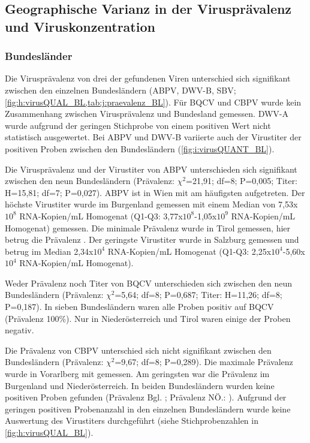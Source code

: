 \subsection{Geographische Varianz in der Virusprävalenz und Viruskonzentration}
\subsubsection{Bundesländer}

Die Virusprävalenz von drei der gefundenen Viren unterschied sich signifikant zwischen den einzelnen Bundesländern (ABPV, DWV-B, SBV; \cref{fig:h:virusQUAL_BL,tab:j:praevalenz_BL}). Für BQCV und CBPV wurde kein Zusammenhang zwischen Virusprävalenz und Bundesland gemessen. DWV-A wurde aufgrund der geringen Stichprobe von einem positiven Wert nicht statistisch ausgewertet. Bei ABPV und DWV-B variierte auch der Virustiter der positiven Proben zwischen den Bundesländern (\cref{fig:i:virusQUANT_BL}). 

Die Virusprävalenz und der Virustiter von ABPV unterschieden sich signifikant zwischen den neun Bundesländern (Prävalenz: $\chi^2$=21,91; df=8; P=0,005; Titer: H=15,81; df=7; P=0,027). ABPV ist in Wien mit  am häufigsten aufgetreten. Der höchste Virustiter wurde im Burgenland gemessen mit einem Median von 7,53x$10^8$ RNA-Kopien/\si{\milli\liter} Homogenat (Q1-Q3: 3,77x$10^8$-1,05x$10^9$ RNA-Kopien/\si{\milli\liter} Homogenat) gemessen. Die minimale Prävalenz wurde in Tirol gemessen, hier betrug die Prävalenz . Der geringste Virustiter wurde in Salzburg gemessen und betrug im Median 2,34x$10^4$ RNA-Kopien/\si{\milli\liter} Homogenat (Q1-Q3: 2,25x$10^4$-5,60x$10^4$ RNA-Kopien/\si{\milli\liter} Homogenat).

Weder Prävalenz noch Titer von BQCV unterschieden sich zwischen den neun Bundesländern (Prävalenz: $\chi^2$=5,64; df=8; P=0,687; Titer: H=11,26; df=8; P=0,187). In sieben Bundesländern waren alle Proben positiv auf BQCV (Prävalenz 100\%). Nur in Niederösterreich und Tirol waren einige der Proben negativ.

Die Prävalenz von CBPV unterschied sich nicht signifikant zwischen den Bundesländern (Prävalenz: $\chi^2$=9,67; df=8; P=0,289). Die maximale Prävalenz wurde in Vorarlberg mit  gemessen. Am geringsten war die Prävalenz im Burgenland und Niederösterreich. In beiden Bundesländern wurden keine positiven Proben gefunden (Prävalenz Bgl. ; Prävalenz NÖ.: ). Aufgrund der geringen positiven Probenanzahl in den einzelnen Bundesländern wurde keine Auswertung des Virustiters durchgeführt (siehe Stichprobenzahlen in \cref{fig:h:virusQUAL_BL}).

